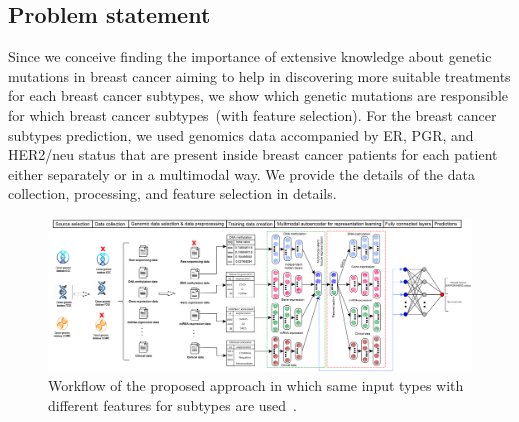 \subsection{Problem statement}
Since we conceive finding the importance of extensive knowledge about genetic mutations in breast cancer aiming to help in discovering more suitable treatments for each breast cancer subtypes, we show which genetic mutations are responsible for which breast cancer subtypes~(with feature selection). %
For the breast cancer subtypes prediction, we used genomics data accompanied by ER, PGR, and HER2/neu status that are present inside breast cancer patients for each patient either separately or in a multimodal way. 
We provide the details of the data collection, processing, and feature selection in details. 

\begin{figure}
	\centering
	\includegraphics[width=\textwidth]{images/mae_v2.png}
	\caption{Workflow of the proposed approach in which same input types with different features for subtypes %
	are used~\cite{karimACCESS2019}.}
	\label{fig:wf_mae}
\end{figure}


